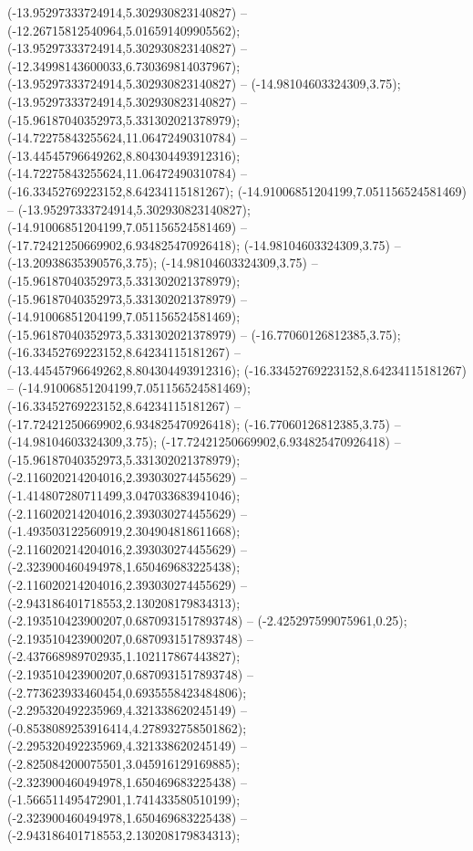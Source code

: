  (-13.95297333724914,5.302930823140827) -- (-12.26715812540964,5.016591409905562);
 (-13.95297333724914,5.302930823140827) -- (-12.34998143600033,6.730369814037967);
 (-13.95297333724914,5.302930823140827) -- (-14.98104603324309,3.75);
 (-13.95297333724914,5.302930823140827) -- (-15.96187040352973,5.331302021378979);
 (-14.72275843255624,11.06472490310784) -- (-13.44545796649262,8.804304493912316);
 (-14.72275843255624,11.06472490310784) -- (-16.33452769223152,8.64234115181267);
 (-14.91006851204199,7.051156524581469) -- (-13.95297333724914,5.302930823140827);
 (-14.91006851204199,7.051156524581469) -- (-17.72421250669902,6.934825470926418);
 (-14.98104603324309,3.75) -- (-13.20938635390576,3.75);
 (-14.98104603324309,3.75) -- (-15.96187040352973,5.331302021378979);
 (-15.96187040352973,5.331302021378979) -- (-14.91006851204199,7.051156524581469);
 (-15.96187040352973,5.331302021378979) -- (-16.77060126812385,3.75);
 (-16.33452769223152,8.64234115181267) -- (-13.44545796649262,8.804304493912316);
 (-16.33452769223152,8.64234115181267) -- (-14.91006851204199,7.051156524581469);
 (-16.33452769223152,8.64234115181267) -- (-17.72421250669902,6.934825470926418);
 (-16.77060126812385,3.75) -- (-14.98104603324309,3.75);
 (-17.72421250669902,6.934825470926418) -- (-15.96187040352973,5.331302021378979);
 (-2.116020214204016,2.393030274455629) -- (-1.414807280711499,3.047033683941046);
 (-2.116020214204016,2.393030274455629) -- (-1.493503122560919,2.304904818611668);
 (-2.116020214204016,2.393030274455629) -- (-2.323900460494978,1.650469683225438);
 (-2.116020214204016,2.393030274455629) -- (-2.943186401718553,2.130208179834313);
 (-2.193510423900207,0.6870931517893748) -- (-2.425297599075961,0.25);
 (-2.193510423900207,0.6870931517893748) -- (-2.437668989702935,1.102117867443827);
 (-2.193510423900207,0.6870931517893748) -- (-2.773623933460454,0.6935558423484806);
 (-2.295320492235969,4.321338620245149) -- (-0.8538089253916414,4.278932758501862);
 (-2.295320492235969,4.321338620245149) -- (-2.825084200075501,3.045916129169885);
 (-2.323900460494978,1.650469683225438) -- (-1.566511495472901,1.741433580510199);
 (-2.323900460494978,1.650469683225438) -- (-2.943186401718553,2.130208179834313);
